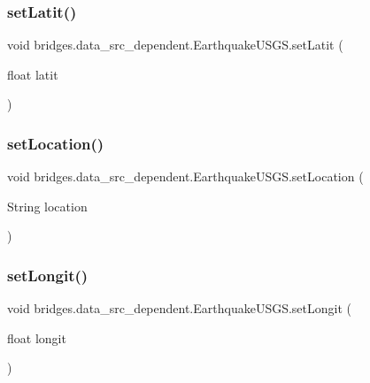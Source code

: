 \subsubsection{\texorpdfstring{set\+Latit()}{setLatit()}}
{\footnotesize\ttfamily void bridges.\+data\+\_\+src\+\_\+dependent.\+Earthquake\+U\+S\+G\+S.\+set\+Latit (\begin{DoxyParamCaption}\item[{float}]{latit }\end{DoxyParamCaption})}

\hypertarget{classbridges_1_1data__src__dependent_1_1_earthquake_u_s_g_s_a473107844daa1ef938dd1b78e585185b}{}\label{classbridges_1_1data__src__dependent_1_1_earthquake_u_s_g_s_a473107844daa1ef938dd1b78e585185b} 
\subsubsection{\texorpdfstring{set\+Location()}{setLocation()}}
{\footnotesize\ttfamily void bridges.\+data\+\_\+src\+\_\+dependent.\+Earthquake\+U\+S\+G\+S.\+set\+Location (\begin{DoxyParamCaption}\item[{String}]{location }\end{DoxyParamCaption})}

\hypertarget{classbridges_1_1data__src__dependent_1_1_earthquake_u_s_g_s_a460d2cf865cfa3a56bbcab8811067bee}{}\label{classbridges_1_1data__src__dependent_1_1_earthquake_u_s_g_s_a460d2cf865cfa3a56bbcab8811067bee} 
\subsubsection{\texorpdfstring{set\+Longit()}{setLongit()}}
{\footnotesize\ttfamily void bridges.\+data\+\_\+src\+\_\+dependent.\+Earthquake\+U\+S\+G\+S.\+set\+Longit (\begin{DoxyParamCaption}\item[{float}]{longit }\end{DoxyParamCaption})}

